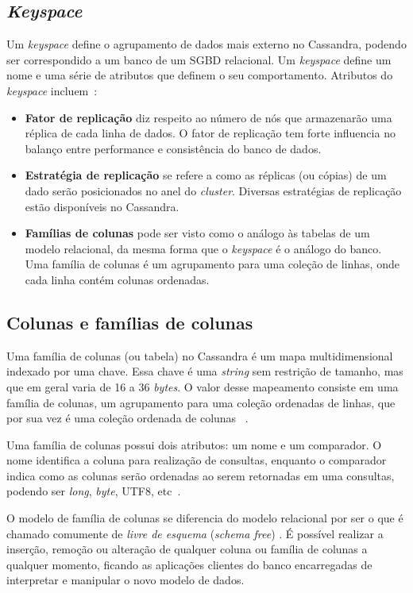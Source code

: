 \subsection*{\emph{Keyspace}}
Um \emph{keyspace} define o agrupamento de dados mais externo no Cassandra, podendo ser correspondido a um banco de um SGBD relacional. Um \emph{keyspace} define um nome e uma série de atributos que definem o seu comportamento. 
Atributos do \emph{keyspace} incluem~\cite{cassandraguide}:
\begin{itemize}
\item \textbf{Fator de replicação} diz respeito ao número de nós que armazenarão uma réplica de cada linha de dados. O fator de replicação tem forte influencia no balanço entre performance e consistência do banco de dados.
\item \textbf{Estratégia de replicação} se refere a como as réplicas (ou cópias) de um dado serão posicionados no anel do \emph{cluster}. Diversas estratégias de replicação estão disponíveis no Cassandra.
\item \textbf{Famílias de colunas} pode ser visto como o análogo às tabelas de um modelo relacional, da mesma forma que o \emph{keyspace} é o análogo do banco.  Uma família de colunas é um agrupamento para uma coleção de linhas, onde cada linha contém colunas ordenadas.
\end{itemize}



\subsection*{Colunas e famílias de colunas}
Uma família de colunas (ou tabela) no Cassandra é um mapa multidimensional indexado por uma chave. Essa chave é uma \emph{string} sem restrição de tamanho, mas que em geral varia de 16 a 36 \emph{bytes}. O valor desse mapeamento consiste em uma família de colunas, um agrupamento para uma coleção ordenadas de linhas, que por sua vez é uma coleção ordenada de colunas ~\cite{lakshmancassandra, cassandraguide}.

Uma família de colunas possui dois atributos: um nome e um comparador. O nome identifica a coluna para realização de consultas, enquanto o comparador indica como as colunas serão ordenadas ao serem retornadas em uma consultas, podendo ser \emph{long}, \emph{byte}, UTF8, etc~\cite{cassandraguide}.

O modelo de família de colunas se diferencia do modelo relacional por ser o que é chamado comumente de \emph{livre de esquema} (\emph{schema free}) . É possível realizar a inserção, remoção ou alteração de qualquer coluna ou família de colunas a qualquer momento, ficando as aplicações clientes do banco encarregadas de interpretar e manipular o novo modelo de dados. 

